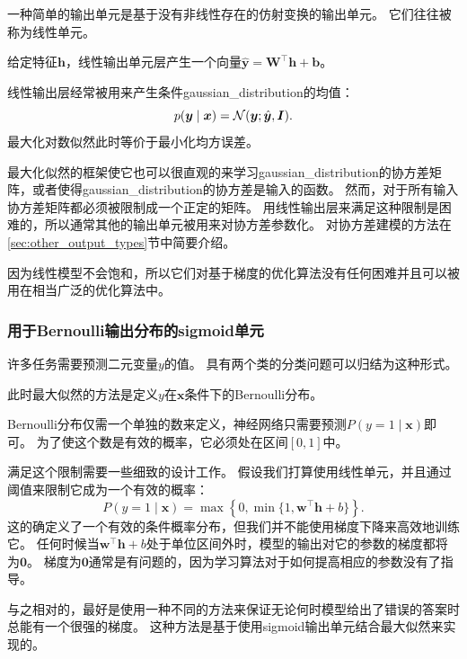 一种简单的输出单元是基于没有非线性存在的仿射变换的输出单元。
它们往往被称为线性单元。

给定特征$\bm{h}$，线性输出单元层产生一个向量$\hat{\bm{y}} = \bm{W}^\top \bm{h}+\bm{b}$。

线性输出层经常被用来产生条件\gls{gaussian_distribution}的均值：
\begin{equation}
p(\bm{y}\mid\bm{x}) = \mathcal{N}(\bm{y}; \hat{\bm{y}}, \bm{I} ).
\end{equation}
最大化对数似然此时等价于最小化均方误差。

最大化似然的框架使它也可以很直观的来学习\gls{gaussian_distribution}的协方差矩阵，或者使得\gls{gaussian_distribution}的协方差是输入的函数。
然而，对于所有输入协方差矩阵都必须被限制成一个正定的矩阵。
用线性输出层来满足这种限制是困难的，所以通常其他的输出单元被用来对协方差参数化。
对协方差建模的方法在\ref{sec:other_output_types}节中简要介绍。

因为线性模型不会饱和，所以它们对基于梯度的优化算法没有任何困难并且可以被用在相当广泛的优化算法中。

\subsubsection{用于Bernoulli输出分布的sigmoid单元}
\label{sec:sigmoid_units_for_bernoulli_output_distributions}

许多任务需要预测二元变量$y$的值。
具有两个类的分类问题可以归结为这种形式。

此时最大似然的方法是定义$y$在$\bm{x}$条件下的Bernoulli分布。

Bernoulli分布仅需一个单独的数来定义，神经网络只需要预测$P(y =1\mid\bm{x})$即可。
为了使这个数是有效的概率，它必须处在区间$[0, 1]$中。

满足这个限制需要一些细致的设计工作。
假设我们打算使用线性单元，并且通过阈值来限制它成为一个有效的概率：
\begin{equation}
P(y=1 \mid \bm{x}) = \max \left \{ 0, \min \{1, \bm{w}^\top \bm{h}+b \} \right \}.
\end{equation}
这的确定义了一个有效的条件概率分布，但我们并不能使用梯度下降来高效地训练它。
任何时候当$\bm{w}^\top \bm{h}+b$处于单位区间外时，模型的输出对它的参数的梯度都将为$\bm{0}$。
梯度为$\bm{0}$通常是有问题的，因为学习算法对于如何提高相应的参数没有了指导。


与之相对的，最好是使用一种不同的方法来保证无论何时模型给出了错误的答案时总能有一个很强的梯度。
这种方法是基于使用sigmoid输出单元结合最大似然来实现的。

